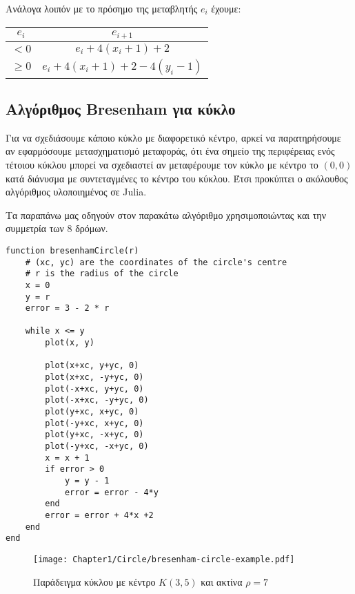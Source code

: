 Ανάλογα λοιπόν με το πρόσημο της μεταβλητής $e_i$ έχουμε:

\begin{table}[htb]
\centering
    \begin{tabular}{@{}c|c@{}}
        \toprule
        $e_i$    & $e_{i+1}$                         \\ \midrule
        $<0$     & $e_i + 4(x_i +1) +2$              \\
        $\geq 0$ & $e_i + 4(x_i +1) +2 - 4(y_i - 1)$ \\ \bottomrule
    \end{tabular}
\end{table}



\subsection{Αλγόριθμος Bresenham για κύκλο}

Για να σχεδιάσουμε κάποιο κύκλο με διαφορετικό κέντρο, αρκεί να παρατηρήσουμε αν εφαρμόσουμε μετασχηματισμό μεταφοράς, ότι ένα σημείο της περιφέρειας ενός τέτοιου κύκλου μπορεί να σχεδιαστεί αν μεταφέρουμε τον κύκλο με κέντρο το $(0,0)$ κατά διάνυσμα με συντεταγμένες το κέντρο του κύκλου. Έτσι προκύπτει ο ακόλουθος αλγόριθμος υλοποιημένος σε Julia.

Τα παραπάνω μας οδηγούν στον παρακάτω αλγόριθμο χρησιμοποιώντας και την συμμετρία των $8$ δρόμων.

\begin{lstlisting}[caption={Bresenham Circle Algorithm}]
function bresenhamCircle(r)
	# (xc, yc) are the coordinates of the circle's centre
	# r is the radius of the circle
	x = 0 
	y = r
	error = 3 - 2 * r
	
	while x <= y
		plot(x, y)
		 
		plot(x+xc, y+yc, 0)
		plot(x+xc, -y+yc, 0) 
		plot(-x+xc, y+yc, 0) 
		plot(-x+xc, -y+yc, 0) 
		plot(y+xc, x+yc, 0) 
		plot(-y+xc, x+yc, 0)
		plot(y+xc, -x+yc, 0) 
		plot(-y+xc, -x+yc, 0) 
		x = x + 1
		if error > 0
			y = y - 1
			error = error - 4*y
		end
		error = error + 4*x +2
	end
end
\end{lstlisting}



\begin{figure}[hbt]
  \begin{center}
	\texttt{[image: Chapter1/Circle/bresenham-circle-example.pdf]}
  \end{center}
  \caption{Παράδειγμα κύκλου με κέντρο $K(3,5)$ και ακτίνα $\rho = 7$}
\end{figure}


